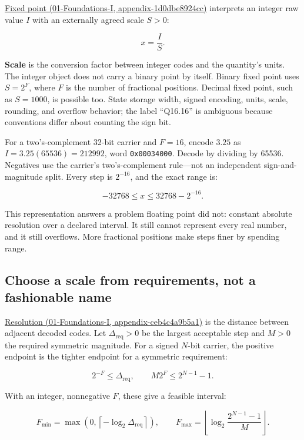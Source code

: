 \href{../01-Foundations-I/main.pdf\#nameddest=appendix-1d0dbe8924cc}{Fixed point (01-Foundations-I, appendix-1d0dbe8924cc)} interprets an integer raw value \(I\) with an externally agreed scale \(S>0\):

\[
x=\frac{I}{S}.
\]

\textbf{Scale} is the conversion factor between integer codes and the quantity's units. The integer object does not carry a binary point by itself. Binary fixed point uses \(S=2^F\), where \(F\) is the number of fractional positions. Decimal fixed point, such as \(S=1000\), is possible too. State storage width, signed encoding, units, scale, rounding, and overflow behavior; the label ``Q16.16'' is ambiguous because conventions differ about counting the sign bit.

For a two's-complement 32-bit carrier and \(F=16\), encode \(3.25\) as \(I=3.25(65536)=212992\), word \texttt{0x00034000}. Decode by dividing by 65536. Negatives use the carrier's two's-complement rule---not an independent sign-and-magnitude split. Every step is \(2^{-16}\), and the exact range is:

\[
-32768\le x\le32768-2^{-16}.
\]

This representation answers a problem floating point did not: constant absolute resolution over a declared interval. It still cannot represent every real number, and it still overflows. More fractional positions make steps finer by spending range.

\subsection{Choose a scale from requirements, not a fashionable name}\label{05-engine-i-ch001-choose-a-scale-from-requirements-not-a-fashionable-name}

\href{../01-Foundations-I/main.pdf\#nameddest=appendix-ceb4c4a9b5a1}{Resolution (01-Foundations-I, appendix-ceb4c4a9b5a1)} is the distance between adjacent decoded codes. Let \(\Delta_{\mathrm{req}}>0\) be the largest acceptable step and \(M>0\) the required symmetric magnitude. For a signed \(N\)-bit carrier, the positive endpoint is the tighter endpoint for a symmetric requirement:

\[
2^{-F}\le\Delta_{\mathrm{req}},
\qquad
M2^F\le2^{N-1}-1.
\]

With an integer, nonnegative \(F\), these give a feasible interval:

\[
F_{\min}=\max\!\left(0,\left\lceil-\log_2\Delta_{\mathrm{req}}\right\rceil\right),
\qquad
F_{\max}=\left\lfloor\log_2\frac{2^{N-1}-1}{M}\right\rfloor.
\]

